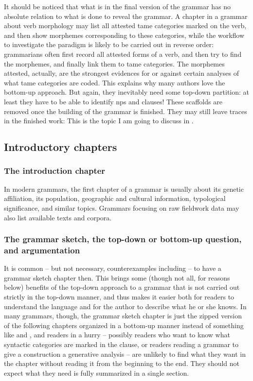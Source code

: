 \documentclass[UTF8, a4paper, oneside, scheme=plain]{ctexart}
\begin{document}
It should be noticed that what is in the final version of the grammar 
has no absolute relation to what is done to reveal the grammar.
A chapter in a grammar about verb morphology 
may list all attested \ac{tame} categories marked on the verb,
and then show morphemes corresponding to these categories,
while the workflow to investigate the paradigm 
is likely to be carried out in reverse order:
grammarians often first record all attested forms of a verb,
and then try to find the morphemes,
and finally link them to \ac{tame} categories.
The morphemes attested, actually, 
are the strongest evidences for or against certain analyses of 
what \ac{tame} categories are coded.
This explains why many authors love the bottom-up approach.
But again, they inevitably need some top-down partition:
at least they have to be able to identify \ac{np}s and clauses!
These scaffolds are removed once the building of the grammar is finished.
They may still leave traces in the finished work:
This is the topic I am going to discuss in .

\subsection{Introductory chapters}

\subsubsection{The introduction chapter}\label{sec:introduction-chapter}

In modern grammars, the first chapter of a grammar is usually about 
its genetic affiliation, its population, 
geographic and cultural information,
typological significance, and similar topics.
Grammars focusing on raw fieldwork data 
may also list available texts and corpora.

\subsubsection{The grammar sketch, the top-down or bottom-up question, and argumentation}\label{sec:grammar-sketch}

It is common -- but not necessary, counterexamples including \citet{Grimm2021} 
-- to have a grammar sketch chapter then.
This brings some (though not all, for reasons below) benefits of the top-down approach
to a grammar that is not carried out strictly in the top-down manner,
and thus makes it easier both for readers to understand the language 
and for the author to describe what he or she knows.
In many grammars, though, the grammar sketch chapter is just 
the zipped version of the following chapters organized in a bottom-up manner
instead of something like  and ,
and readers in a hurry 
-- possibly readers who want to know what syntactic categories are marked in the clause,
or readers reading a grammar to give a construction a generative analysis  --
are unlikely to find what they want in the chapter without reading it from the beginning to the end.
They should not expect what they need is fully summarized in a single section.
\end{document}
